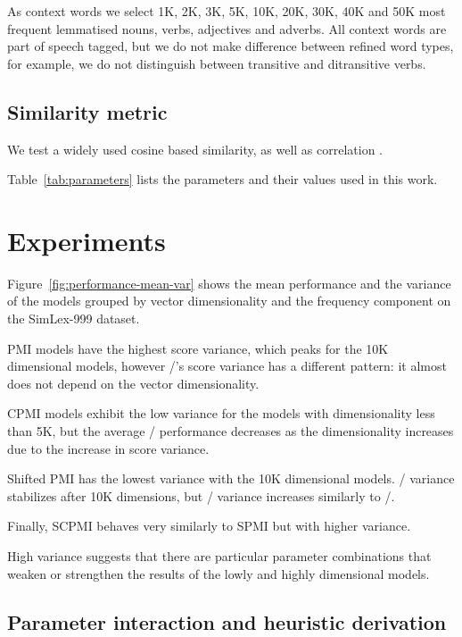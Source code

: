 \documentclass[11pt,letterpaper]{article}
\begin{document}
As context words we select 1K, 2K, 3K, 5K, 10K, 20K, 30K, 40K and 50K most frequent lemmatised nouns, verbs, adjectives and adverbs. All context words are part of speech tagged, but we do not make difference between refined word types, for example, we do not distinguish between transitive and ditransitive verbs.

\subsection{Similarity metric}
\label{sec:similarity-metric}

We test a widely used cosine based similarity, as well as correlation \cite{kiela-clark:2014:CVSC}.

Table~\ref{tab:parameters} lists the parameters and their values used in this work.

\section{Experiments}
\label{sec:lexical-experiments}

Figure~\ref{fig:performance-mean-var} shows the mean performance and the variance of the models grouped by vector dimensionality and the frequency component on the SimLex-999 dataset.

PMI models have the highest score variance, which peaks for the 10K dimensional models, however \NPMI/'s score variance has a different pattern: it almost does not depend on the vector dimensionality.

CPMI models exhibit the low variance for the models with dimensionality less than 5K, but the average \NCPMI/ performance decreases as the dimensionality increases due to the increase in score variance.

Shifted PMI has the lowest variance with the 10K dimensional models. \logNSPMI/ variance stabilizes after 10K dimensions, but \SPMI/ variance increases similarly to \CPMI/.

Finally, SCPMI behaves very similarly to SPMI but with higher variance.


High variance suggests that there are particular parameter combinations that weaken or strengthen the results of the lowly and highly dimensional models.


\subsection{Parameter interaction and heuristic derivation}
\end{document}
